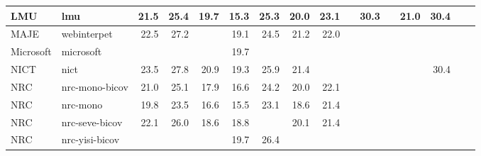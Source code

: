 \begin{table*}
\begin{center}
\begin{tabular}{|l|l|rrrrrrr|rrrrrrr|}
LMU & lmu & 21.5 & 25.4 & 19.7 & 15.3 & 25.3 & 20.0 & 23.1 & \cellcolor{lightyellow}{25.6} & 30.3 & \cellcolor{lightyellow}{22.4} & 21.0 & 30.4 & \cellcolor{lightyellow}{23.3} & \cellcolor{lightyellow}{26.2} \\ \hline
MAJE & webinterpet & 22.5 & 27.2 & \cellcolor{lightyellow}{21.3} & 19.1 & 24.5 & 21.2 & 22.0 & \cellcolor{lightgreen}{26.1} & \cellcolor{lightyellow}{30.7} & \cellcolor{lightgreen}{22.9} & \cellcolor{lightgreen}{22.4} & \cellcolor{lightyellow}{30.6} & \cellcolor{lightgreen}{23.7} & \cellcolor{lightyellow}{26.2} \\ \hline
Microsoft & microsoft & \cellcolor{lightgreen}{24.4} & \cellcolor{lightgreen}{29.5} & \cellcolor{lightyellow}{21.6} & 19.7 & \cellcolor{green}{28.7} & \cellcolor{lightgreen}{22.5} & \cellcolor{lightyellow}{24.7} & \cellcolor{green}{26.5} & \cellcolor{green}{31.4} & \cellcolor{green}{23.2} & \cellcolor{lightgreen}{22.3} & \cellcolor{green}{31.4} & \cellcolor{lightgreen}{23.9} & \cellcolor{green}{26.9} \\ \hline
NICT & nict & 23.5 & 27.8 & 20.9 & 19.3 & 25.9 & 21.4 & \cellcolor{green}{25.5} & \cellcolor{lightyellow}{26.0} & \cellcolor{lightyellow}{30.8} & \cellcolor{lightgreen}{22.8} & \cellcolor{lightyellow}{22.0} & 30.4 & \cellcolor{lightyellow}{23.4} & \cellcolor{lightgreen}{26.6} \\ \hline
NRC & nrc-mono-bicov & 21.0 & 25.1 & 17.9 & 16.6 & 24.2 & 20.0 & 22.1 & \cellcolor{lightgreen}{26.2} & \cellcolor{lightgreen}{31.1} & \cellcolor{lightgreen}{22.8} & \cellcolor{lightgreen}{22.4} & \cellcolor{lightgreen}{31.1} & \cellcolor{lightgreen}{23.8} & \cellcolor{lightyellow}{26.2} \\ \hline
NRC & nrc-mono & 19.8 & 23.5 & 16.6 & 15.5 & 23.1 & 18.6 & 21.4 & \cellcolor{lightyellow}{26.0} & \cellcolor{lightyellow}{30.6} & \cellcolor{lightyellow}{22.7} & \cellcolor{lightgreen}{22.1} & \cellcolor{lightyellow}{30.7} & \cellcolor{lightgreen}{23.7} & \cellcolor{lightyellow}{26.2} \\ \hline
NRC & nrc-seve-bicov & 22.1 & 26.0 & 18.6 & 18.8 & \cellcolor{lightyellow}{27.9} & 20.1 & 21.4 & \cellcolor{lightgreen}{26.2} & \cellcolor{lightgreen}{31.1} & \cellcolor{lightgreen}{22.8} & \cellcolor{lightgreen}{22.2} & \cellcolor{lightgreen}{31.2} & \cellcolor{lightgreen}{23.7} & \cellcolor{lightgreen}{26.5} \\ \hline
NRC & nrc-yisi-bicov & \cellcolor{lightyellow}{23.9} & \cellcolor{lightyellow}{28.7} & \cellcolor{lightyellow}{21.3} & 19.7 & 26.4 & \cellcolor{lightyellow}{22.1} & \cellcolor{lightgreen}{25.2} & \cellcolor{lightgreen}{26.4} & \cellcolor{green}{31.4} & \cellcolor{lightgreen}{22.8} & \cellcolor{lightgreen}{22.4} & \cellcolor{lightgreen}{31.1} & \cellcolor{lightgreen}{23.8} & \cellcolor{green}{26.9} \\ \hline

\end{tabular}
\end{center}
\end{table*}
